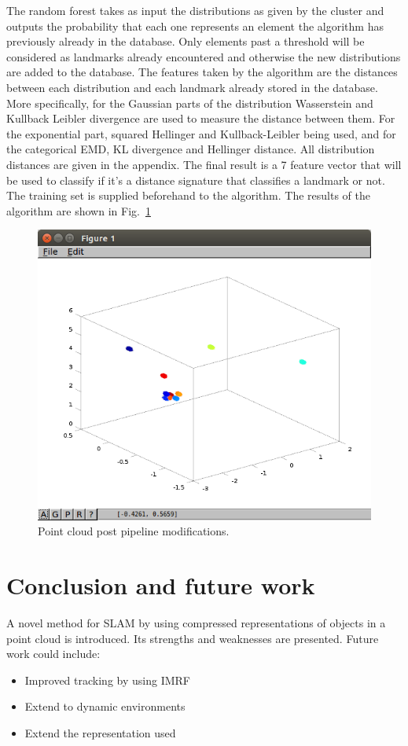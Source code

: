 \documentclass[twoside,hidelinks]{article}
\begin{document}
The random forest takes as input the distributions as given by the cluster and outputs the probability that each one represents an element the algorithm has previously already in the database. Only elements past a threshold will be considered as landmarks already encountered and otherwise the new distributions are added to the database. The features taken by the algorithm are the distances between each distribution and each landmark already stored in the database. More specifically, for the Gaussian parts of the distribution Wasserstein and Kullback Leibler divergence are used to measure the distance between them. For the exponential part, squared Hellinger and Kullback-Leibler being used, and for the categorical EMD, KL divergence and Hellinger distance. All distribution distances are given in the appendix. The final result is a 7 feature vector that will be used to classify if it's a distance signature that classifies a landmark or not. The training set is supplied beforehand to the algorithm. The results of the algorithm are shown in Fig.~\ref{pcl:features}

\begin{figure}[h!]
  \centering
    \includegraphics[width=.5\textwidth]{landmarkClasification}
    \caption{Point cloud post pipeline modifications.}
  \label{pcl:features}
\end{figure}

\section{Conclusion and future work}
\label{sec:discussion}

A novel method for SLAM by using compressed representations of objects in a point cloud is introduced. Its strengths and weaknesses are presented. Future work could include:
\begin{itemize}
    \item Improved tracking by using IMRF
    \item Extend to dynamic environments
    \item Extend the representation used
\end{itemize}
\end{document}
